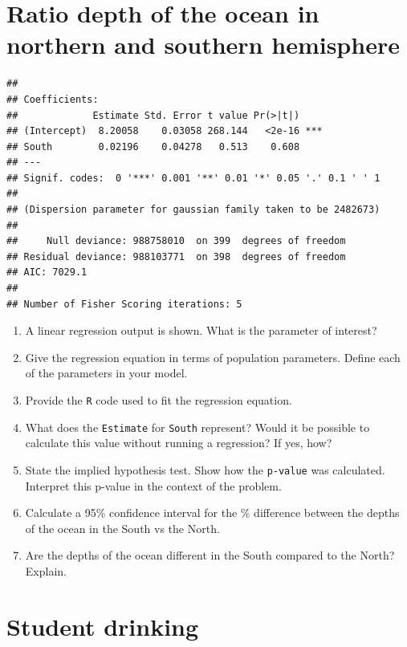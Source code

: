 \documentclass[landscape,twocolumn,letterpaper,9pt,reqno]{article}\usepackage[]{graphicx}\usepackage[]{color}
\newenvironment{knitrout}{}{} %
\newcommand{\compresslist}{ %
	\setlength{\itemsep}{1pt}
	\setlength{\parskip}{0pt}
	\setlength{\parsep}{0pt}
}
\begin{document}
\clearpage

\section{Ratio depth of the ocean in northern and southern hemisphere}

\begin{knitrout}
\color{fgcolor}
\begin{verbatim}
## 
## Coefficients:
##             Estimate Std. Error t value Pr(>|t|)    
## (Intercept)  8.20058    0.03058 268.144   <2e-16 ***
## South        0.02196    0.04278   0.513    0.608    
## ---
## Signif. codes:  0 '***' 0.001 '**' 0.01 '*' 0.05 '.' 0.1 ' ' 1
## 
## (Dispersion parameter for gaussian family taken to be 2482673)
## 
##     Null deviance: 988758010  on 399  degrees of freedom
## Residual deviance: 988103771  on 398  degrees of freedom
## AIC: 7029.1
## 
## Number of Fisher Scoring iterations: 5
\end{verbatim}

\end{knitrout}


\begin{enumerate}\compresslist
	\item A linear regression output is shown. What is the parameter of interest?
	\item Give the regression equation in terms of population parameters. Define each of the parameters in your model.
	\item Provide the \texttt{R} code used to fit the regression equation.
	\item What does the \texttt{Estimate} for \texttt{South} represent? Would it be possible to calculate this value without running a regression? If yes, how?
	\item State the implied hypothesis test. Show how the \texttt{p-value} was calculated. Interpret this p-value in the context of the problem. 
	\item Calculate a 95\% confidence interval for the \% difference between the depths of the ocean in the South vs the North. 
	\item Are the depths of the ocean different in the South compared to the North? Explain. 
\end{enumerate}


\clearpage


\section{Student drinking}
\end{document}
